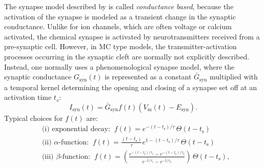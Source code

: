 The synapse model described by  is called \textit{conductance based}, because the activation of the synapse is modeled as a transient change in the synaptic conductance. Unlike for ion channels, which are often voltage or calcium activated, the chemical synapse is activated by neurotransmitters received from a pre-synaptic cell. However, in MC type models, the transmitter-activation processes occurring in the synaptic cleft are normally not explicitly described. Instead, one normally uses a phenomenological synapse model, where the synaptic conductance $G_\text{syn}(t)$ is represented as a constant $\bar{G}_\text{syn}$ multiplied with a temporal kernel determining the opening and closing of a synapse set off at an activation time $t_s$:
\begin{equation}
I_\text{syn}(t) = \bar{G}_\text{syn} f(t) \left(V_\mathrm{m}(t)-E_\text{syn} \right).
\label{eq:Neuron:chemicalsynapse}
\end{equation}
Typical choices for $f(t)$ are: 
\begin{align}
&\text{(i) exponential decay:} \;\; f(t) = e^{-(t-t_\text{s})/\tau}\, \Theta(t-t_\text{s}) \\
&\text{(ii) $\alpha$-function:} \;\; f(t) =  \frac{(t-t_\text{s})}{\tau}e^{1-(t-t_\text{s})/\tau} \, \Theta(t-t_\text{s}) \\
&\text{(iii) $\beta$-function:} \;\; f(t) = \left( \frac{e^{-(t-t_\text{s})/\tau_1} - e^{-(t-t_\text{s})/\tau_2} }{e^{-\tilde{t}/\tau_1} - e^{-\tilde{t}/\tau_2} } \right) \, \Theta(t-t_\text{s}), 
\label{eq:Neuron:sf4}
\end{align}


